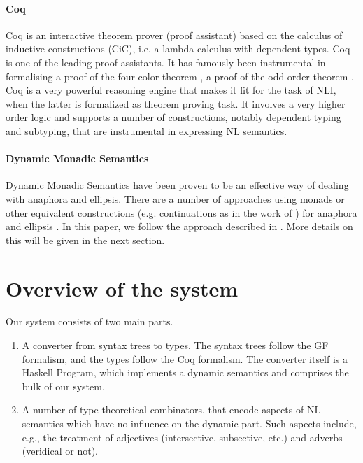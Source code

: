 \documentclass[11pt]{article}
\begin{document}
\paragraph{Coq}
Coq is an interactive theorem prover (proof assistant) based on the
calculus of inductive constructions (CiC), i.e.  a lambda calculus
with dependent types. Coq is  one of the leading proof
assistants. It has famously been instrumental in formalising a proof
of the four-color theorem \citep{Gonthier:2008}, a proof of the odd
order theorem \citep{Gonthier:2013}. Coq is a very powerful
reasoning engine that makes it fit for the task of NLI, when the
latter is formalized as theorem proving task. It involves a very higher order logic  and supports a number of constructions, notably dependent typing and subtyping, that are instrumental in expressing NL semantics.  

\paragraph{Dynamic Monadic Semantics}
Dynamic Monadic Semantics have been proven to be an effective way of
dealing with anaphora and ellipsis. There are a number of approaches
using monads or other equivalent constructions (e.g. continuations as in the work of
\citet{de2006}) for anaphora and ellipsis
\citet{Shan:2002,unger:2011,Barker:04,de2016,charlow:2017}. In this
paper, we follow the approach described in
\citet{bernardy_jolli}. More details on this will be given in the next
section.



\section{Overview of the system}

Our system consists of two main parts.
\begin{enumerate}
\item A converter from syntax trees to types. The syntax trees follow
  the GF formalism, and the types follow the Coq formalism. The
  converter itself is a Haskell Program, which implements a dynamic
  semantics and comprises the bulk of our system.
\item A number of type-theoretical combinators, that encode aspects of NL semantics which have no influence on the dynamic
  part. Such aspects include, e.g.,  the treatment of adjectives
  (intersective, subsective, etc.) and adverbs (veridical or not).
\end{enumerate}
\end{document}
